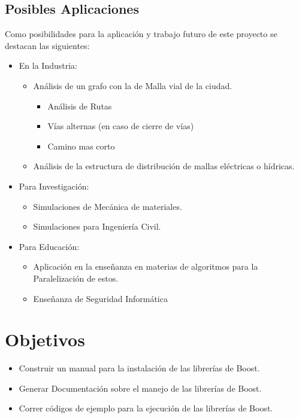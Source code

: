 \begin{itemize}
\section{Posibles Aplicaciones}

Como posibilidades para la aplicación y trabajo futuro de este proyecto se destacan las siguientes: 

\begin{itemize}
	\item En la Industria:

	\begin{itemize}
		\item Análisis de un grafo con la de Malla vial de la ciudad.
			\begin{itemize}
			 	\item Análisis de Rutas
			 	\item Vías alternas (en caso de cierre de vías)
			 	\item Camino mas corto 
			 \end{itemize} 

		\item Análisis de la estructura de distribución de mallas eléctricas o hídricas.

	\end{itemize}

	\item Para Investigación: 

	\begin{itemize}
		\item Simulaciones de Mecánica de materiales.
		\item Simulaciones para Ingeniería Civil.		
	\end{itemize}

	\item Para Educación: 
		\begin{itemize}
			\item Aplicación en la enseñanza en materias de algoritmos para la Paralelización de estos. 
			\item Enseñanza de Seguridad Informática
		\end{itemize}

\end{itemize}
\end{itemize}

\section{Objetivos}

	\begin{itemize}
		\item Construir un manual para la instalación de las librerías de Boost.
		\item Generar Documentación sobre el manejo de las librerías de Boost.
		\item Correr códigos de ejemplo para la ejecución de las librerías de Boost.
	\end{itemize}

